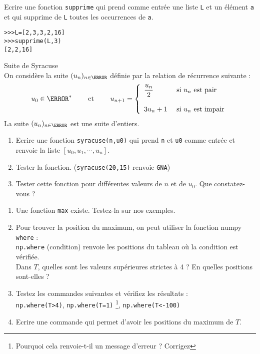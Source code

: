 \begin{exercice}
Ecrire une fonction \verb?supprime? qui prend comme entrée une liste \verb?L? et un élément \verb?a? et qui supprime de \verb?L? toutes les occurrences de \verb?a?.
\begin{verbatim}
>>>L=[2,3,3,2,16]
>>>supprime(L,3)
[2,2,16]
\end{verbatim}
\end{exercice}



\begin{exercice}Suite de Syracuse\\
On consid\` ere la suite $(u_n)_{n\in\N}$ définie par la relation de récurrence suivante :
\[u_0\in\N^*\qquad \text{ et }\qquad u_{n+1}=\left\lbrace\begin{array}{lll}
\dfrac{u_n}{2}&\text{ si } u_n \text{ est pair} \bigskip \\
3u_n+1&\text{ si } u_n \text{ est impair}
\end{array}\right.\]
La suite $(u_n)_{n\in\N}$ est une suite d'entiers. 
\begin{enumerate}
\item Ecrire une fonction \verb?syracuse(n,u0)? qui prend \verb?n? et \verb?u0? comme entrée et renvoie la liste $[u_0,u_1,\cdots,u_n]$.
\item Tester la fonction. (\verb?syracuse(20,15)? renvoie \verb?GNA?)
\item Tester cette fonction pour différentes valeurs de $n$ et de $u_0$. Que constatez-vous ? 
\end{enumerate}
\end{exercice}






\begin{exercice}
\begin{enumerate}
\item Une fonction \verb?max? existe. Testez-la sur nos exemples.
\item Pour trouver la position du maximum, on peut utiliser la fonction numpy \verb?where? :\\
\verb?np.where? (condition) renvoie les positions du tableau o\` u la condition est vérifiée. \\
Dans $T$, quelles sont les valeurs supérieures strictes \` a 4 ? En quelles positions sont-elles ?
\item Testez les commandes suivantes et vérifiez les résultats :\\
\verb?np.where(T>4)?, \verb?np.where(T=1)? \footnote{Pourquoi cela renvoie-t-il un message d'erreur ? Corrigez}, \verb?np.where(T<-100)?
\item Ecrire une commande qui permet d'avoir les positions du maximum de $T$.
\end{enumerate}
\end{exercice}





